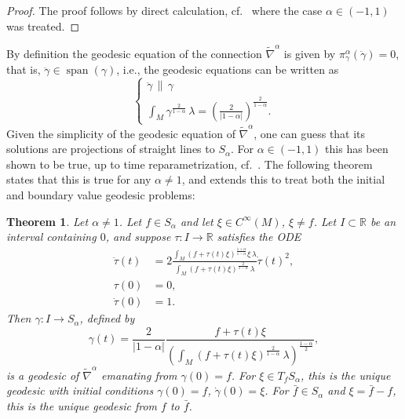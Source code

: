 \documentclass[11pt,reqno]{amsart}
\newtheorem{theorem}{Theorem}[section]
\theoremstyle{definition}
\begin{document}
\begin{proof}
    The proof follows by direct calculation,  cf.~\cite[Theorem 3.12 and Theorem~4.10]{bauer2024p} where the case $\alpha\in(-1,1)$ was treated.
\end{proof}



By definition the geodesic equation of the connection $\tilde{\nabla}^\alpha$ is given by
$\pi^\alpha_\gamma (\ddot\gamma) = 0$, that is, $\ddot\gamma \in \operatorname{span}(\gamma)$, i.e., the geodesic equations can be written as
    \[
    \begin{cases}
        \ddot \gamma \,\parallel \, \gamma \\
        \int_M \gamma^{\frac{2}{1-\alpha}} \,\lambda = \left(\frac{2}{|1-\alpha|}\right)^{\frac{2}{1-\alpha}}.
    \end{cases}
    \]
Given the simplicity of the geodesic equation of $\tilde{\nabla}^\alpha$, one can guess that its solutions are projections of straight lines to $S_\alpha$.
For $\alpha\in (-1,1)$ this has been shown to be true, up to time reparametrization, cf.~\cite[Theorem 4.11]{bauer2024p}.
The following theorem states that this is true for any $\alpha\neq 1$, and extends this to treat both the initial and boundary value geodesic problems:
\begin{theorem}
    \label{thm:sulotion_prob}
    Let $\alpha\neq 1$. Let $f\in S_\alpha$ and let $\xi \in C^\infty(M)$, $\xi\ne f$.
    Let $I \subset \mathbb{R}$ be an interval containing $0$, and suppose $\tau : I \to \mathbb{R}$ satisfies the ODE
    \[
    \begin{split}
        \ddot\tau (t) &= 2 \frac{\int_M (f + \tau(t)\xi)^{\frac{1+\alpha}{1-\alpha}} \xi \,\lambda}{\int_M (f + \tau(t)\xi)^{\frac{2}{1-\alpha}} \,\lambda}\dot\tau(t)^2, \\
        \tau(0) &=0, \\
        \dot{\tau}(0) &=1.
    \end{split}
    \]
    Then $\gamma : I \to S_\alpha$, defined by
    \[
    \gamma(t) = \frac{2}{|1-\alpha|}\frac{f+ \tau(t)\xi}{\left(\int_M (f+\tau(t)\xi)^{\frac{2}{1-\alpha}}\,\lambda\right)^{\frac{1-\alpha}{2}}},
    \]
    is a geodesic of $\tilde{\nabla}^\alpha$ emanating from $\gamma(0)=f$.
    For $\xi\in T_f S_\alpha$, this is the unique geodesic with initial conditions $\gamma(0) = f$, $\dot{\gamma}(0) = \xi$.
    For $\bar{f}\in S_\alpha$ and $\xi = \bar{f} - f$, this is the unique geodesic from $f$ to $\bar{f}$.
\end{theorem}
\end{document}

